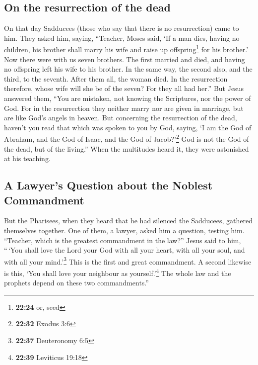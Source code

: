 \hypertarget{on-the-resurrection-of-the-dead}{%
\subsection{On the resurrection of the
dead}\label{on-the-resurrection-of-the-dead}}

 On that day Sadducees (those who say that there is no
resurrection) came to him. They asked him,  saying,
``Teacher, Moses said, `If a man dies, having no children, his brother
shall marry his wife and raise up offspring\footnote{\textbf{22:24} or,
  seed} for his brother.'  Now there were with us seven
brothers. The first married and died, and having no offspring left his
wife to his brother.  In the same way, the second also,
and the third, to the seventh.  After them all, the woman
died.  In the resurrection therefore, whose wife will she
be of the seven? For they all had her.''  But Jesus
answered them, ``You are mistaken, not knowing the Scriptures, nor the
power of God.  For in the resurrection they neither marry
nor are given in marriage, but are like God's angels in heaven.
 But concerning the resurrection of the dead, haven't you
read that which was spoken to you by God, saying,  `I am
the God of Abraham, and the God of Isaac, and the God of
Jacob?'\footnote{\textbf{22:32} Exodus 3:6} God is not the God of the
dead, but of the living.''  When the multitudes heard it,
they were astonished at his teaching.

\hypertarget{a-lawyers-question-about-the-noblest-commandment}{%
\subsection{A Lawyer's Question about the Noblest
Commandment}\label{a-lawyers-question-about-the-noblest-commandment}}

 But the Pharisees, when they heard that he had silenced
the Sadducees, gathered themselves together.  One of
them, a lawyer, asked him a question, testing him. 
``Teacher, which is the greatest commandment in the law?''
 Jesus said to him, ``\,`You shall love the Lord your God
with all your heart, with all your soul, and with all your
mind.'\footnote{\textbf{22:37} Deuteronomy 6:5}  This is
the first and great commandment.  A second likewise is
this, `You shall love your neighbour as yourself.'\footnote{\textbf{22:39}
  Leviticus 19:18}  The whole law and the prophets depend
on these two commandments.''

